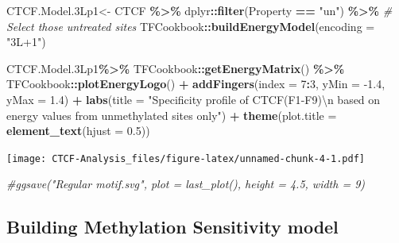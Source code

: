 \documentclass[
]{article}
\newenvironment{Shaded}{\begin{snugshade}}{\end{snugshade}}
\newcommand{\CharTok}[1]{\textcolor[rgb]{0.31,0.60,0.02}{#1}}
\newcommand{\CommentTok}[1]{\textcolor[rgb]{0.56,0.35,0.01}{\textit{#1}}}
\newcommand{\DataTypeTok}[1]{\textcolor[rgb]{0.13,0.29,0.53}{#1}}
\newcommand{\DecValTok}[1]{\textcolor[rgb]{0.00,0.00,0.81}{#1}}
\newcommand{\FloatTok}[1]{\textcolor[rgb]{0.00,0.00,0.81}{#1}}
\newcommand{\KeywordTok}[1]{\textcolor[rgb]{0.13,0.29,0.53}{\textbf{#1}}}
\newcommand{\NormalTok}[1]{#1}
\newcommand{\OperatorTok}[1]{\textcolor[rgb]{0.81,0.36,0.00}{\textbf{#1}}}
\newcommand{\StringTok}[1]{\textcolor[rgb]{0.31,0.60,0.02}{#1}}
\begin{document}
\begin{Shaded}
\begin{Highlighting}[]
\NormalTok{CTCF.Model}\FloatTok{.3}\NormalTok{Lp1\textless{}{-}}\StringTok{ }\NormalTok{CTCF }\OperatorTok{\%\textgreater{}\%}
\StringTok{  }\NormalTok{dplyr}\OperatorTok{::}\KeywordTok{filter}\NormalTok{(Property }\OperatorTok{==}\StringTok{ "un"}\NormalTok{) }\OperatorTok{\%\textgreater{}\%}\StringTok{ }\CommentTok{\# Select those untreated sites}
\StringTok{  }\NormalTok{TFCookbook}\OperatorTok{::}\KeywordTok{buildEnergyModel}\NormalTok{(}\DataTypeTok{encoding =} \StringTok{"3L+1"}\NormalTok{)}

\NormalTok{CTCF.Model}\FloatTok{.3}\NormalTok{Lp1}\OperatorTok{\%\textgreater{}\%}
\StringTok{  }\NormalTok{TFCookbook}\OperatorTok{::}\KeywordTok{getEnergyMatrix}\NormalTok{() }\OperatorTok{\%\textgreater{}\%}
\StringTok{  }\NormalTok{TFCookbook}\OperatorTok{::}\KeywordTok{plotEnergyLogo}\NormalTok{() }\OperatorTok{+}
\StringTok{  }\KeywordTok{addFingers}\NormalTok{(}\DataTypeTok{index =} \DecValTok{7}\OperatorTok{:}\DecValTok{3}\NormalTok{, }\DataTypeTok{yMin =}  \FloatTok{{-}1.4}\NormalTok{, }\DataTypeTok{yMax =} \FloatTok{1.4}\NormalTok{) }\OperatorTok{+}
\StringTok{  }\KeywordTok{labs}\NormalTok{(}\DataTypeTok{title =} \StringTok{"Specificity profile of CTCF(F1{-}F9)}\CharTok{\textbackslash{}n}\StringTok{ based on energy values from unmethylated sites only"}\NormalTok{) }\OperatorTok{+}
\StringTok{  }\KeywordTok{theme}\NormalTok{(}\DataTypeTok{plot.title =} \KeywordTok{element\_text}\NormalTok{(}\DataTypeTok{hjust =} \FloatTok{0.5}\NormalTok{))}
\end{Highlighting}
\end{Shaded}

\texttt{[image: CTCF-Analysis\_files/figure-latex/unnamed-chunk-4-1.pdf]}

\begin{Shaded}
\begin{Highlighting}[]
\CommentTok{\#ggsave("Regular motif.svg", plot = last\_plot(), height = 4.5, width = 9)}
\end{Highlighting}
\end{Shaded}

\hypertarget{building-methylation-sensitivity-model}{%
\subsection{Building Methylation Sensitivity
model}\label{building-methylation-sensitivity-model}}
\end{document}
